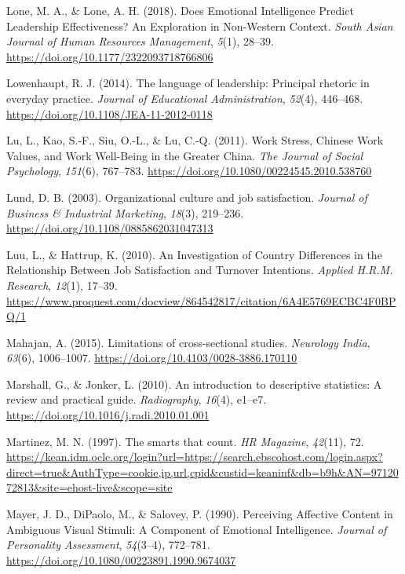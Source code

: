 \documentclass[
  man,
  longtable,
  nolmodern,
  notxfonts,
  notimes,
  colorlinks=true,linkcolor=blue,citecolor=blue,urlcolor=blue]{apa7}
\newlength{\cslhangindent}
\newenvironment{CSLReferences}[2] %
 {\begin{list}{}{%
  \setlength{\itemindent}{0pt}
  \setlength{\leftmargin}{0pt}
  \setlength{\parsep}{0pt}
  \ifodd #1
   \setlength{\leftmargin}{\cslhangindent}
   \setlength{\itemindent}{-1\cslhangindent}
  \fi
  \setlength{\itemsep}{#2\baselineskip}}}
 {\end{list}}
\begin{document}
\begin{CSLReferences}{1}{0}
Lone, M. A., \& Lone, A. H. (2018). Does {Emotional Intelligence Predict
Leadership Effectiveness}? {An Exploration} in {Non-Western Context}.
\emph{South Asian Journal of Human Resources Management}, \emph{5}(1),
28--39. \url{https://doi.org/10.1177/2322093718766806}

Lowenhaupt, R. J. (2014). The language of leadership: Principal rhetoric
in everyday practice. \emph{Journal of Educational Administration},
\emph{52}(4), 446--468. \url{https://doi.org/10.1108/JEA-11-2012-0118}

Lu, L., Kao, S.-F., Siu, O.-L., \& Lu, C.-Q. (2011). Work {Stress},
{Chinese Work Values}, and {Work Well-Being} in the {Greater China}.
\emph{The Journal of Social Psychology}, \emph{151}(6), 767--783.
\url{https://doi.org/10.1080/00224545.2010.538760}

Lund, D. B. (2003). Organizational culture and job satisfaction.
\emph{Journal of Business \& Industrial Marketing}, \emph{18}(3),
219--236. \url{https://doi.org/10.1108/0885862031047313}

Luu, L., \& Hattrup, K. (2010). An {Investigation} of {Country
Differences} in the {Relationship Between Job Satisfaction} and
{Turnover Intentions}. \emph{Applied H.R.M. Research}, \emph{12}(1),
17--39.
\url{https://www.proquest.com/docview/864542817/citation/6A4E5769ECBC4F0BPQ/1}

Mahajan, A. (2015). Limitations of cross-sectional studies.
\emph{Neurology India}, \emph{63}(6), 1006--1007.
\url{https://doi.org/10.4103/0028-3886.170110}

Marshall, G., \& Jonker, L. (2010). An introduction to descriptive
statistics: {A} review and practical guide. \emph{Radiography},
\emph{16}(4), e1--e7. \url{https://doi.org/10.1016/j.radi.2010.01.001}

Martinez, M. N. (1997). The smarts that count. \emph{HR Magazine},
\emph{42}(11), 72.
\url{https://kean.idm.oclc.org/login?url=https://search.ebscohost.com/login.aspx?direct=true&AuthType=cookie,ip,url,cpid&custid=keaninf&db=b9h&AN=9712072813&site=ehost-live&scope=site}

Mayer, J. D., DiPaolo, M., \& Salovey, P. (1990). Perceiving {Affective
Content} in {Ambiguous Visual Stimuli}: {A Component} of {Emotional
Intelligence}. \emph{Journal of Personality Assessment},
\emph{54}(3--4), 772--781.
\url{https://doi.org/10.1080/00223891.1990.9674037}


\end{CSLReferences}
\end{document}
